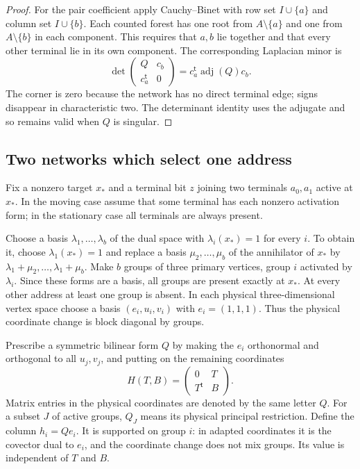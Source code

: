 \begin{proof}
For the pair coefficient apply Cauchy--Binet with row set $I\cup\{a\}$
and column set $I\cup\{b\}$.  Each counted forest has one root from
$A\setminus\{a\}$ and one from $A\setminus\{b\}$ in each component.
This requires that $a,b$ lie together and that every other terminal lie
in its own component.  The corresponding Laplacian minor is
\[
 \det\begin{pmatrix}Q&c_b\\c_a^{\mathsf t}&0\end{pmatrix}
       =c_a^{\mathsf t}\operatorname{adj}(Q)c_b.
\]
The corner is zero because the network has no direct terminal edge;
signs disappear in characteristic two.  The determinant identity uses
the adjugate and so remains valid when $Q$ is singular.
\end{proof}

\subsection{Two networks which select one address}

Fix a nonzero target $x_*$ and a terminal bit $z$ joining two terminals
$a_0,a_1$ active at $x_*$.  In the
moving case assume that some terminal has each nonzero activation form;
in the stationary case all terminals are always present.

Choose a basis $\lambda_1,\ldots,\lambda_b$ of the dual space with
$\lambda_i(x_*)=1$ for every $i$.  To obtain it, choose $\lambda_1(x_*)=1$
and replace a basis $\mu_2,\ldots,\mu_b$ of the annihilator of $x_*$ by
$\lambda_1+\mu_2,\ldots,\lambda_1+\mu_b$.
Make $b$ groups of three primary vertices, group $i$ activated by
$\lambda_i$.  Since these forms are a basis, all groups are present
exactly at $x_*$.  At every other address at least one group is absent.
In each physical three-dimensional vertex space choose
a basis $(e_i,u_i,v_i)$ with $e_i=(1,1,1)$.  Thus the physical coordinate
change is block diagonal by groups.

Prescribe a symmetric bilinear form $Q$ by making the $e_i$ orthonormal
and orthogonal to all $u_j,v_j$, and putting on the remaining coordinates
\begin{equation}\label{gr:H}
 H(T,B)=\begin{pmatrix}0&T\\T^{\mathsf t}&B\end{pmatrix}.
\end{equation}
Matrix entries in the physical coordinates are denoted by the same
letter $Q$.  For a subset $J$ of active groups, $Q_J$ means its physical
principal restriction.  Define the column $h_i=Qe_i$.
It is supported on group $i$: in adapted coordinates it is the covector
dual to $e_i$, and the coordinate change does not mix groups.  Its value
is independent of $T$ and $B$.

